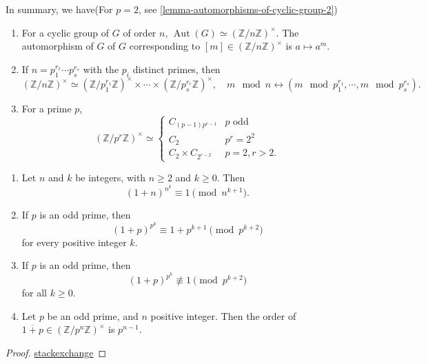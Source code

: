 In summary, we have(For \( p = 2 \), see \ref{lemma-automorphisms-of-cyclic-group-2})
\begin{theorem}
  \label{theorem-automorphisms-of-cyclic-group}
  \begin{enumerate}
    \item For a cyclic group of \( G \) of order \( n \), \( \operatorname{Aut}(G) \simeq (\mathbb{Z} / n \mathbb{Z})^\times \).
      The automorphism of \( G \) of \( G \) corresponding to \( [m] \in (\mathbb{Z} / n\mathbb{Z})^{\times} \) is \( a \mapsto a^m \).
    \item If \( n = p^{r_1}_1 \cdots p^{r_s}_s \) with the \( p_i \) distinct primes, then
      \[
        (\mathbb{Z} / n\mathbb{Z})^\times \simeq (\mathbb{Z} / p^{r_1}_1\mathbb{Z})^\times \times \cdots \times (\mathbb{Z} / p_s^{r_r}\mathbb{Z})^\times,\quad m \mod{n} \leftrightarrow (m \mod{p_1^{r_1}}, \cdots, m \mod{p_s^{r_s}}).
      \]
    \item For a prime \( p \),
      \[
        (\mathbb{Z} / p^r \mathbb{Z})^\times \simeq \begin{cases}
          C_{(p - 1)p^{r - 1}} & p \text{ odd }\\
          C_2 & p^r = 2^2\\
          C_2 \times C_{2^{r - 2}} & p = 2, r > 2.
        \end{cases}
      \]
  \end{enumerate}
\end{theorem}
\begin{lemma}
  \label{lemma-automorphisms-of-cyclic-group-1}
  \begin{enumerate}
    \item Let \( n \) and \( k \) be integers, with \( n \geq 2 \) and \( k \geq 0 \).
      Then
      \[
        (1 + n)^{n^k} \equiv 1 \pmod{n^{k + 1}}.
      \]
    \item If \( p \) is an odd prime, then
      \[
        (1 + p)^{p^k} \equiv 1 + p^{k + 1} \pmod{p^{k + 2}}
      \]
      for every positive integer \( k \).
    \item If \( p \) is an odd prime, then
      \[
        (1 + p)^{p^k} \not\equiv 1 \pmod{p^{k + 2}}
      \]
      for all \( k \geq 0 \).
    \item Let \( p \) be an odd prime, and \( n \) positive integer.
      Then the order of \( \overline{1 + p} \in (\mathbb{Z} / p^{n}\mathbb{Z})^{\times} \) is \( p^{n - 1} \).
  \end{enumerate}
\end{lemma}
\begin{proof}
  \href{https://math.stackexchange.com/questions/238414/showing-1p-is-an-element-of-order-pn-1-in-mathbbz-pn-mathbbz-t}{stackexchange}
\end{proof}

